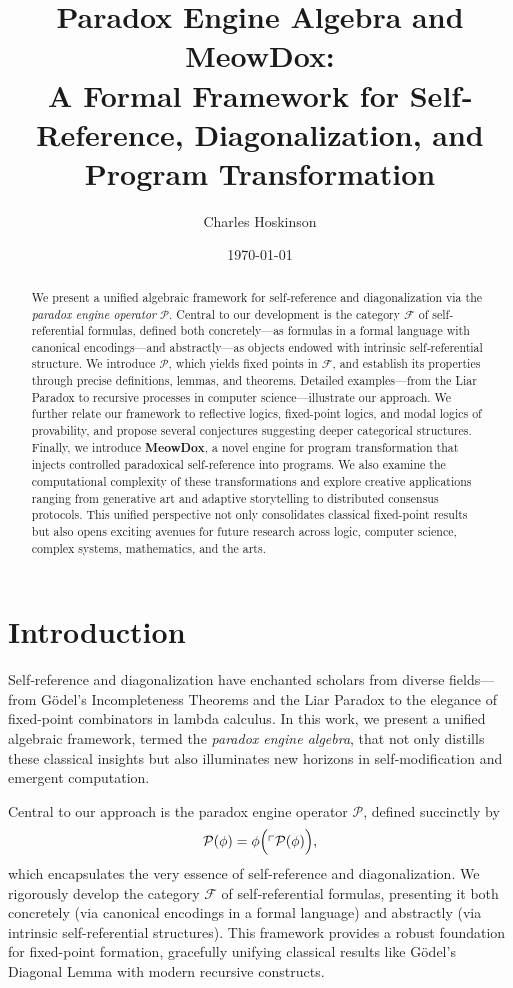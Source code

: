 \documentclass[12pt]{amsart}
\title[Paradox Engine Algebra and MeowDox]{Paradox Engine Algebra and MeowDox:\\ A Formal Framework for Self‐Reference, Diagonalization, and Program Transformation}
\author{Charles Hoskinson}
\date{\today}
\theoremstyle{plain}
\theoremstyle{definition}
\theoremstyle{remark}
\begin{document}
\maketitle

\begin{abstract}
We present a unified algebraic framework for self‐reference and diagonalization via the \emph{paradox engine operator} $\mathcal{P}$. Central to our development is the category $\mathcal{F}$ of self‐referential formulas, defined both concretely---as formulas in a formal language with canonical encodings---and abstractly---as objects endowed with intrinsic self‐referential structure. We introduce $\mathcal{P}$, which yields fixed points in $\mathcal{F}$, and establish its properties through precise definitions, lemmas, and theorems. Detailed examples---from the Liar Paradox to recursive processes in computer science---illustrate our approach. We further relate our framework to reflective logics, fixed-point logics, and modal logics of provability, and propose several conjectures suggesting deeper categorical structures. Finally, we introduce \textbf{MeowDox}, a novel engine for program transformation that injects controlled paradoxical self-reference into programs. We also examine the computational complexity of these transformations and explore creative applications ranging from generative art and adaptive storytelling to distributed consensus protocols. This unified perspective not only consolidates classical fixed-point results but also opens exciting avenues for future research across logic, computer science, complex systems, mathematics, and the arts.
\end{abstract}

\tableofcontents

\section{Introduction}
Self‐reference and diagonalization have enchanted scholars from diverse fields---from Gödel’s Incompleteness Theorems and the Liar Paradox to the elegance of fixed-point combinators in lambda calculus. In this work, we present a unified algebraic framework, termed the \emph{paradox engine algebra}, that not only distills these classical insights but also illuminates new horizons in self‐modification and emergent computation.

Central to our approach is the paradox engine operator $\mathcal{P}$, defined succinctly by
\[
\mathcal{P}(\phi) = \phi\Bigl(\ulcorner \mathcal{P}(\phi) \Bigr),
\]
which encapsulates the very essence of self-reference and diagonalization. We rigorously develop the category $\mathcal{F}$ of self‐referential formulas, presenting it both concretely (via canonical encodings in a formal language) and abstractly (via intrinsic self-referential structures). This framework provides a robust foundation for fixed-point formation, gracefully unifying classical results like Gödel’s Diagonal Lemma with modern recursive constructs.
\end{document}
